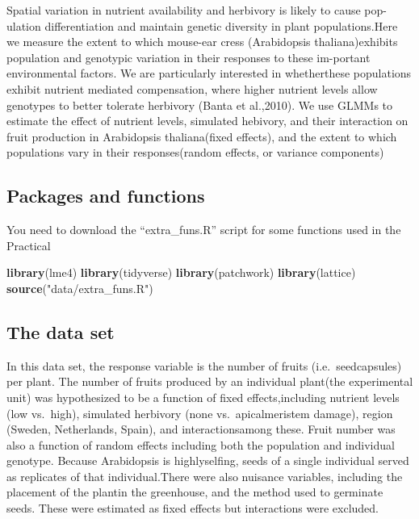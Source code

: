 \documentclass[
  12pt,
]{book}
\newenvironment{Shaded}{\begin{snugshade}}{\end{snugshade}}
\newcommand{\KeywordTok}[1]{\textcolor[rgb]{0.13,0.29,0.53}{\textbf{#1}}}
\newcommand{\NormalTok}[1]{#1}
\newcommand{\StringTok}[1]{\textcolor[rgb]{0.31,0.60,0.02}{#1}}
\begin{document}
Spatial variation in nutrient availability and herbivory is likely to cause pop-ulation differentiation and maintain genetic diversity in plant populations.Here we measure the extent to which mouse-ear cress (Arabidopsis thaliana)exhibits population and genotypic variation in their responses to these im-portant environmental factors. We are particularly interested in whetherthese populations exhibit nutrient mediated compensation, where higher nutrient levels allow genotypes to better tolerate herbivory (Banta et al.,2010). We use GLMMs to estimate the effect of nutrient levels, simulated hebivory, and their interaction on fruit production in Arabidopsis thaliana(fixed effects), and the extent to which populations vary in their responses(random effects, or variance components)

\hypertarget{packages-and-functions}{%
\subsection{Packages and functions}\label{packages-and-functions}}

You need to download the ``extra\_funs.R'' script for some functions used in the Practical

\begin{Shaded}
\begin{Highlighting}[]
\KeywordTok{library}\NormalTok{(lme4)}
\KeywordTok{library}\NormalTok{(tidyverse)}
\KeywordTok{library}\NormalTok{(patchwork)}
\KeywordTok{library}\NormalTok{(lattice)}
\KeywordTok{source}\NormalTok{(}\StringTok{"data/extra\_funs.R"}\NormalTok{)}
\end{Highlighting}
\end{Shaded}

\hypertarget{the-data-set}{%
\subsection{The data set}\label{the-data-set}}

In this data set, the response variable is the number of fruits (i.e.~seedcapsules) per plant. The number of fruits produced by an individual plant(the experimental unit) was hypothesized to be a function of fixed effects,including nutrient levels (low vs.~high), simulated herbivory (none vs.~apicalmeristem damage), region (Sweden, Netherlands, Spain), and interactionsamong these. Fruit number was also a function of random effects including both the population and individual genotype. Because Arabidopsis is highlyselfing, seeds of a single individual served as replicates of that individual.There were also nuisance variables, including the placement of the plantin the greenhouse, and the method used to germinate seeds. These were estimated as fixed effects but interactions were excluded.
\end{document}
